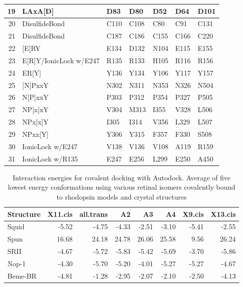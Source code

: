 {{\begin{longtable}{rllllll}
  19 & LAxA[D] & D83 & D80 & D52 & D64 & D101 \\ 
   \hline
20 & DisulfideBond & C110 & C108 & C80 & C91 & C131 \\ 
  21 & DisulfideBond & C187 & C186 & C155 & C166 & C220 \\ 
   \hline
22 & [E]RY & E134 & D132 & N104 & E115 & E155 \\ 
  23 & E[R]Y/IonicLock w/E247 & R135 & R133 & H105 & R116 & R156 \\ 
  24 & ER[Y] & Y136 & Y134 & Y106 & Y117 & Y157 \\ 
   \hline
25 & [N]PxxY & N302 & N311 & N353 & N326 & N504 \\ 
  26 & N[P]xxY & P303 & P312 & P354 & P327 & P505 \\ 
  27 & NP[x]xY & V304 & M313 & I355 & V328 & L506 \\ 
  28 & NPx[x]Y & I305 & I314 & V356 & L329 & L507 \\ 
  29 & NPxx[Y] & Y306 & Y315 & F357 & F330 & S508 \\ 
   \hline
30 & IonicLock w/E247 & V138 & V136 & V108 & A119 & R159 \\ 
  31 & IonicLock w/R135 & E247 & E256 & L299 & E250 & A450 \\ 
   \hline
\hline
\end{longtable}
}
}
\begin{table}[h]
\caption[Interaction energies for covalent docking]{Interaction energies for covalent docking with Autodock. Average of five lowest energy conformations using various retinal isomers covalently bound to rhodopsin models and crystal structures} 
\label{tab:ChRhodS_covDock}
\centering
\begin{tabular}{lrrrrrrr}
  \hline
\hline
Structure & X11.cis & all.trans & A2 & A3 & A4 & X9.cis & X13.cis \\ 
  \hline
Squid & -5.52 & -4.75 & -4.33 & -2.51 & -3.10 & -5.41 & -2.55 \\ 
  Spun & 16.68 & 24.18 & 24.78 & 26.06 & 25.58 & 9.56 & 26.24 \\ 
  SRII & -4.67 & -5.72 & -5.83 & -5.42 & -5.69 & -3.70 & -5.86 \\ 
  Nop-1 & -4.30 & -5.70 & -5.20 & -4.01 & -5.27 & -5.27 & -4.67 \\ 
  Beme-BR & -4.81 & -1.28 & -2.95 & -2.07 & -2.10 & -2.50 & -4.13 \\ 
   \hline
\hline
\end{tabular}
\end{table}
